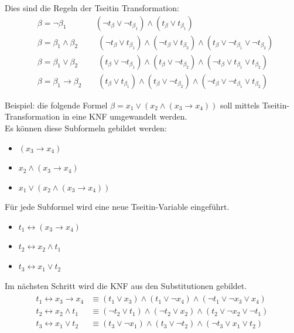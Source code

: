 \documentclass[a4,abstract=on]{scrartcl}
\begin{document}
Dies sind die Regeln der Tseitin Transformation:
\begin{align*}
&\beta=\neg \beta_1 {~~~~~~~~~~~~~~~~} (\neg t_\beta \vee \neg t_{\beta_1 }) \wedge (t_\beta \vee t_{\beta_1})\\
&\beta=\beta_1 \wedge \beta_2 {~~~~~~~~~~~} (\neg t_\beta \vee  t_{\beta_1 }) \wedge (\neg t_\beta \vee t_{\beta_2}) \wedge (t_\beta \vee \neg t_{\beta_1} \vee \neg t_{\beta_2})\\
&\beta=\beta_1 \vee \beta_2 {~~~~~~~~~~~} (t_\beta \vee  \neg t_{\beta_1 }) \wedge (t_\beta \vee \neg t_{\beta_2}) \wedge (\neg t_\beta \vee t_{\beta_1} \vee t_{\beta_2})\\
&\beta=\beta_1 \rightarrow \beta_2 {~~~~~~~~~} (t_\beta \vee  t_{\beta_1 }) \wedge (t_\beta \vee \neg t_{\beta_2}) \wedge (\neg t_\beta \vee \neg t_{\beta_1} \vee t_{\beta_2})
\end{align*}

Beispiel: die folgende Formel $\beta = x_1 \vee (x_2 \wedge (x_3 \rightarrow x_4))$ soll mittels Tseitin-Transformation in eine KNF umgewandelt werden.\\
Es können diese Subformeln gebildet werden:\\
\begin{itemize}
\item $(x_3 \rightarrow x_4)$
\item $x_2 \wedge (x_3 \rightarrow x_4)$
\item $x_1 \vee (x_2 \wedge (x_3 \rightarrow x_4))$
\end{itemize}

Für jede Subformel wird eine neue Tseitin-Variable eingeführt.\\
\begin{itemize}
\item $t_1 \leftrightarrow (x_3 \rightarrow x_4)$
\item $t_2 \leftrightarrow x_2 \wedge t_1$
\item $t_3 \leftrightarrow x_1 \vee t_2$
\end{itemize}

Im nächsten Schritt wird die KNF aus den Substitutionen gebildet.\\
\begin{align*}
\begin{aligned}
t_1 \leftrightarrow x_3 \rightarrow x_4 &\equiv (t_1 \vee  x_3) \wedge (t_1 \vee \neg x_4) \wedge (\neg t_1 \vee \neg x_3 \vee x_4)\\
t_2 \leftrightarrow x_2 \wedge t_1 &\equiv (\neg t_2 \vee  t_1) \wedge (\neg t_2 \vee x_2) \wedge (t_2 \vee \neg x_2 \vee \neg t_1)\\
t_3 \leftrightarrow x_1 \vee t_2 &\equiv (t_3 \vee  \neg x_1) \wedge (t_3 \vee \neg t_2) \wedge (\neg t_3 \vee x_1 \vee t_2)\\
\end{aligned}
\end{align*}
\end{document}
